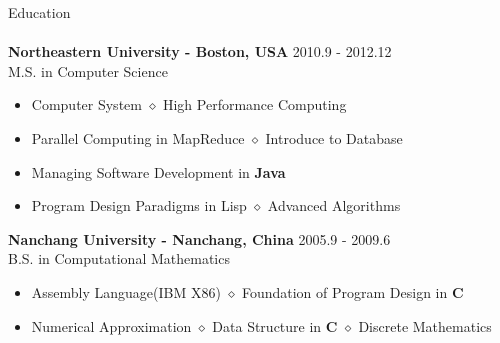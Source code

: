 \documentclass[10pt]{article}
\newcommand{\lineunder}{\vspace*{-8pt}\\\hspace*{-18pt}\hrulefill\\}
\newcommand{\header}[1]{{\hspace*{-15pt}\vspace*{6pt}\large{{#1}}}\vspace*{-6pt}\lineunder}
\newcommand{\college}[5]{
    \textbf{#1 #2} \hfill #3 \\ #4 \\ #5
}
\begin{document}
\header{Education}

\college{Northeastern University}{- Boston, USA} {2010.9 - 2012.12}
{M.S. in Computer Science}
{
\begin{itemize}
  \setlength{\itemsep}{0pt}
  \setlength{\parsep}{0pt}
  \setlength{\parskip}{0pt}
  \item {Computer System $\diamond$ High Performance Computing}
  \item {Parallel Computing in MapReduce $\diamond$ Introduce to Database}
  \item {Managing Software Development in \textbf{Java}}
  \item {Program Design Paradigms in Lisp $\diamond$ Advanced Algorithms}  
\end{itemize}
}

\vspace*{5pt}

\college{Nanchang University}{- Nanchang, China} {2005.9 - 2009.6}
{B.S. in Computational Mathematics}
{
\begin{itemize}
  \setlength{\itemsep}{0pt}
  \setlength{\parsep}{0pt}
  \setlength{\parskip}{0pt}
  \item {Assembly Language(IBM X86) $\diamond$ Foundation of Program Design in \textbf{C}}
  \item {Numerical Approximation $\diamond$ Data Structure in \textbf{C} $\diamond$ Discrete Mathematics}
\end{itemize}
}

\end{document}
